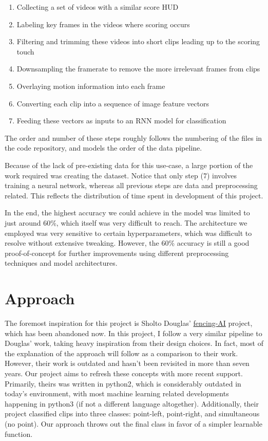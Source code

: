 \documentclass[10pt,twocolumn,letterpaper]{article}
\begin{document}
\begin{enumerate}
    \item Collecting a set of videos with a similar score HUD
    \item Labeling key frames in the videos where scoring occurs
    \item Filtering and trimming these videos into short clips leading up to the scoring touch
    \item Downsampling the framerate to remove the more irrelevant frames from clips
    \item Overlaying motion information into each frame
    \item Converting each clip into a sequence of image feature vectors
    \item Feeding these vectors as inputs to an RNN model for classification
\end{enumerate}

The order and number of these steps roughly follows the numbering of the files in the code repository, and models the order of the data pipeline.

Because of the lack of pre-existing data for this use-case, a large portion of the work required was creating the dataset.
Notice that only step (7) involves training a neural network, whereas all previous steps are data and preprocessing related.
This reflects the distribution of time spent in development of this project.

In the end, the highest accuracy we could achieve in the model was limited to just around 60\%, which itself was very difficult to reach.
The architecture we employed was very sensitive to certain hyperparameters, which was difficult to resolve without extensive tweaking.
However, the 60\% accuracy is still a good proof-of-concept for further improvements using different preprocessing techniques and model architectures.

\section{Approach}
The foremost inspiration for this project is Sholto Douglas' \href{https://github.com/sholtodouglas/fencing-AI}{fencing-AI} project, which has been abandoned now.
In this project, I follow a very similar pipeline to Douglas' work, taking heavy inspiration from their design choices.
In fact, most of the explanation of the approach will follow as a comparison to their work.
However, their work is outdated and hasn't been revisited in more than seven years.
Our project aims to refresh these concepts with more recent support.
Primarily, theirs was written in python2, which is considerably outdated in today's environment, with most machine learning related developments happening in python3 (if not a different language altogether).
Additionally, their project classified clips into three classes: point-left, point-right, and simultaneous (no point).
Our approach throws out the final class in favor of a simpler learnable function.
\end{document}
